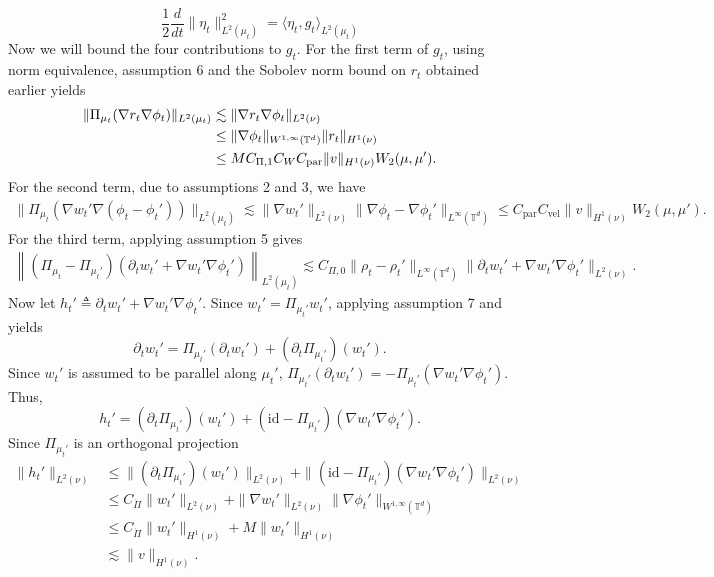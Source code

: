 \documentclass[11pt]{article}
\begin{document}
\[ \frac{1}{2}\frac{d}{dt}\|\eta_t\|_{L^2(\mu_t)}^2 = \langle \eta_t, g_t\rangle_{L^2(\mu_t)}\]
Now we will bound the four contributions to $g_t$. For the first term of $g_t$, using norm equivalence, assumption 6 and the Sobolev norm bound on $r_t$ obtained earlier yields
\begin{align*}
    \|\Pi_{\mu_t}(\nabla r_t\nabla \phi_t)\|_{L^2(\mu_t)} &\lesssim  \|\nabla r_t \nabla \phi_t\|_{L^2(\nu)} \\
    &\leq \|\nabla \phi_t\|_{W^{1, \infty}(\mathbb{T}^d)}\|r_t\|_{H^1(\nu)} \\
    &\leq MC_{\Pi,1}C_W C_{\rm par}\|v\|_{H^1(\nu)}W_2(\mu,\mu').
\end{align*}
For the second term, due to assumptions 2 and 3, we have
\begin{align*}
    \|\Pi_{\mu_t}(\nabla w_t' \nabla(\phi_t - \phi_t'))\|_{L^2(\mu_t)} \lesssim  \|\nabla w_t'\|_{L^2(\nu)}\|\nabla\phi_t - \nabla\phi_t'\|_{L^{\infty}(\mathbb{T}^d)} \leq C_\text{par}C_{\text{vel}}\|v\|_{H^1(\nu)}W_2(\mu, \mu').
\end{align*}
For the third term, applying assumption 5 gives
\begin{align*}
    \left\|(\Pi_{\mu_t} - \Pi_{\mu_t'})(\partial_tw_t'  + \nabla w_t'\nabla \phi_t')\right\|_{L^2(\mu_t)} \lesssim  C_{\Pi,0}\|\rho_t - \rho_t'\|_{L^{\infty}(\mathbb{T}^d)}\|\partial_tw_t' + \nabla w_t'\nabla \phi_t'\|_{L^2(\nu)}.
\end{align*}
Now let $h_t' \triangleq \partial_tw_t' + \nabla w_t'\nabla \phi_t'$. Since $w_t' = \Pi_{\mu_t'}w_t'$, applying assumption 7 and  yields
\[\partial_t w_t' = \Pi_{\mu_t'}(\partial_tw_t') + (\partial_t\Pi_{\mu_t'})(w_t').\]
Since $w_t'$ is assumed to be parallel along $\mu_t'$, $\Pi_{\mu_t'}(\partial_t w_t') = -\Pi_{\mu_t'}(\nabla w_t' \nabla \phi_t')$. Thus,
\[h_t' = (\partial_t\Pi_{\mu_t'})(w_t') +(\text{id} - \Pi_{\mu_t'})(\nabla w_t' \nabla \phi_t').\]
Since $\Pi_{\mu_t'}$ is an orthogonal projection
\begin{align*}
    \|h_t'\|_{L^2(\nu)} &\leq \|(\partial_t\Pi_{\mu_t'})(w_t')\|_{L^2(\nu)} + \|(\text{id} - \Pi_{\mu_t'})(\nabla w_t' \nabla \phi_t')\|_{L^2(\nu)} \\
    &\leq C_{\dot \Pi}\|w_t'\|_{L^2(\nu)} + \|\nabla w_t'\|_{L^2(\nu)}\|\nabla \phi_t'\|_{W^{1, \infty}(\mathbb{T}^d)} \\
    &\leq C_{\dot \Pi}\|w_t'\|_{H^1(\nu)} + M\|w_t'\|_{H^1(\nu)} \\
    &\lesssim \|v\|_{H^1(\nu)}.
\end{align*}
\end{document}
